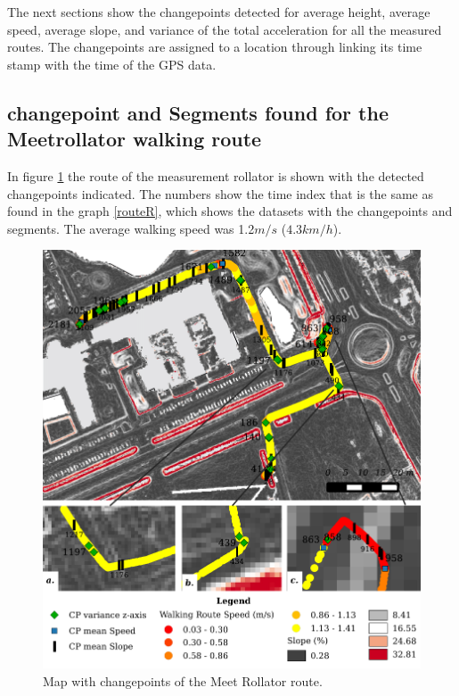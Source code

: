 The next sections show the changepoints detected for average height, average speed, average slope, and variance of the total acceleration for all the measured routes. The changepoints are assigned to a location through linking its time stamp with the time of the GPS data. 

\clearpage

\subsection{changepoint and Segments found for the Meetrollator walking route}
In figure \ref{routeM} the route of the measurement rollator is shown with the detected changepoints indicated. The numbers show the time index that is the same as found in the graph \ref{routeR}, which shows the datasets with the changepoints and segments. The average walking speed was 1.2$m/s$ ($4.3km/h$).

\begin{figure}[ht]
\includegraphics[width=\textwidth]{img/R_meetrollatorroute.pdf}
\centering
\caption{Map with changepoints of the Meet Rollator route.\label{routeM}}
\end{figure} 

\clearpage

